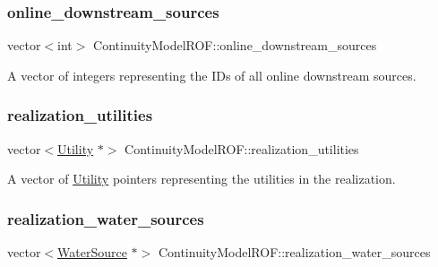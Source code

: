 \subsubsection{\texorpdfstring{online\+\_\+downstream\+\_\+sources}{online\_downstream\_sources}}
{\footnotesize\ttfamily vector$<$int$>$ Continuity\+Model\+R\+O\+F\+::online\+\_\+downstream\+\_\+sources\hspace{0.3cm}{\ttfamily [private]}}



A vector of integers representing the I\+Ds of all online downstream sources. 

\mbox{\label{classContinuityModelROF_a75c6823d8dd37f274ee91ce158088dc4}} 
\subsubsection{\texorpdfstring{realization\+\_\+utilities}{realization\_utilities}}
{\footnotesize\ttfamily vector$<$\mbox{\hyperlink{classUtility}{Utility}} $\ast$$>$ Continuity\+Model\+R\+O\+F\+::realization\+\_\+utilities\hspace{0.3cm}{\ttfamily [protected]}}



A vector of {\ttfamily \mbox{\hyperlink{classUtility}{Utility}}} pointers representing the utilities in the realization. 

\mbox{\label{classContinuityModelROF_a77048d247b8d1f70fbdd31559b4d3337}} 
\subsubsection{\texorpdfstring{realization\+\_\+water\+\_\+sources}{realization\_water\_sources}}
{\footnotesize\ttfamily vector$<$\mbox{\hyperlink{classWaterSource}{Water\+Source}} $\ast$$>$ Continuity\+Model\+R\+O\+F\+::realization\+\_\+water\+\_\+sources\hspace{0.3cm}{\ttfamily [protected]}}



